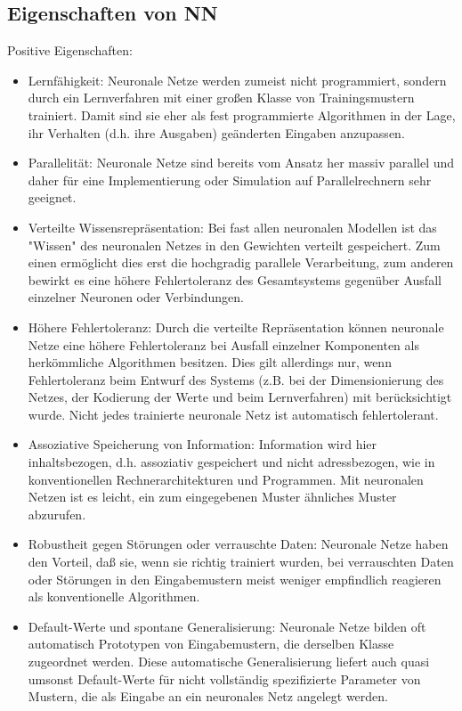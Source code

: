 \subsection*{Eigenschaften von NN}
Positive Eigenschaften:
\begin{itemize}[noitemsep]
\item Lernfähigkeit: Neuronale Netze werden zumeist nicht programmiert, sondern
durch ein Lernverfahren mit einer großen Klasse von Trainingsmustern
trainiert. Damit sind sie eher als fest programmierte Algorithmen in der
Lage, ihr Verhalten (d.h. ihre Ausgaben) geänderten Eingaben anzupassen.

\item Parallelität: Neuronale Netze sind bereits vom Ansatz her massiv parallel
und daher für eine Implementierung oder Simulation auf Parallelrechnern
sehr geeignet.

\item Verteilte Wissensrepräsentation: Bei fast allen neuronalen Modellen ist das
"Wissen" des neuronalen Netzes in den Gewichten verteilt gespeichert. Zum
einen ermöglicht dies erst die hochgradig parallele Verarbeitung, zum
anderen bewirkt es eine höhere Fehlertoleranz des Gesamtsystems gegenüber
Ausfall einzelner Neuronen oder Verbindungen.

\item Höhere Fehlertoleranz: Durch die verteilte Repräsentation können neuronale
Netze eine höhere Fehlertoleranz bei Ausfall einzelner Komponenten als
herkömmliche Algorithmen besitzen. Dies gilt allerdings nur, wenn
Fehlertoleranz beim Entwurf des Systems (z.B. bei der Dimensionierung des
Netzes, der Kodierung der Werte und beim Lernverfahren) mit
berücksichtigt wurde. Nicht jedes trainierte neuronale Netz ist automatisch
fehlertolerant.

\item Assoziative Speicherung von Information: Information wird hier
inhaltsbezogen, d.h. assoziativ gespeichert und nicht adressbezogen, wie in
konventionellen Rechnerarchitekturen und Programmen. Mit neuronalen
Netzen ist es leicht, ein zum eingegebenen Muster ähnliches Muster
abzurufen.

\item Robustheit gegen Störungen oder verrauschte Daten: Neuronale Netze
haben den Vorteil, daß sie, wenn sie richtig trainiert wurden, bei
verrauschten Daten oder Störungen in den Eingabemustern meist weniger
empfindlich reagieren als konventionelle Algorithmen.

\item Default-Werte und spontane Generalisierung: Neuronale Netze bilden oft
automatisch Prototypen von Eingabemustern, die derselben Klasse
zugeordnet werden. Diese automatische Generalisierung liefert auch quasi
umsonst Default-Werte für nicht vollständig spezifizierte Parameter von
Mustern, die als Eingabe an ein neuronales Netz angelegt werden.


\end{itemize}
